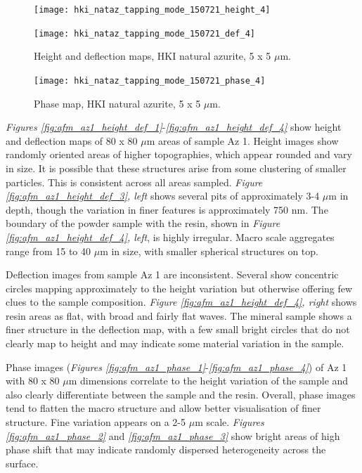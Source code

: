 \begin{figure}[H]
\centering
\begin{minipage}{.45\textwidth}
  \centering
  \texttt{[image: hki\_nataz\_tapping\_mode\_150721\_height\_4]}
\end{minipage}
\begin{minipage}{.45\textwidth}
  \centering
  \texttt{[image: hki\_nataz\_tapping\_mode\_150721\_def\_4]}
\end{minipage}
\caption[Height and deflection maps, HKI natural azurite]{Height and deflection maps, HKI natural azurite, 5 x 5 $\mu$m.}
\label{fig:afm_hki_nataz_height_def_5}
\end{figure}

\begin{figure}[H]
\centering
  \texttt{[image: hki\_nataz\_tapping\_mode\_150721\_phase\_4]}
\caption[Phase map, HKI natural azurite]{Phase map, HKI natural azurite, 5 x 5 $\mu$m.}
\label{fig:afm_hki_nataz_phase_5}
\end{figure}



\textit{Figures \ref{fig:afm_az1_height_def_1}}-\textit{\ref{fig:afm_az1_height_def_4}} show height and deflection maps of 80 x 80 $\mu$m areas of sample Az 1. Height images show randomly oriented areas of higher topographies, which appear rounded and vary in size. It is possible that these structures arise from some clustering of smaller particles. This is consistent across all areas sampled. \textit{Figure \ref{fig:afm_az1_height_def_3}, left} shows several pits of approximately 3-4 $\mu$m in depth, though the variation in finer features is approximately 750 nm. The boundary of the powder sample with the resin, shown in \textit{Figure \ref{fig:afm_az1_height_def_4}, left}, is highly irregular. Macro scale aggregates range from 15 to 40 $\mu$m in size, with smaller spherical structures on top.

Deflection images from sample Az 1 are inconsistent. Several show concentric circles mapping approximately to the height variation but otherwise offering few clues to the sample composition. \textit{Figure \ref{fig:afm_az1_height_def_4}, right} shows resin areas as flat, with broad and fairly flat waves. The mineral sample shows a finer structure in the deflection map, with a few small bright circles that do not clearly map to height and may indicate some material variation in the sample.

Phase images (\textit{Figures \ref{fig:afm_az1_phase_1}}-\textit{\ref{fig:afm_az1_phase_4}}) of Az 1 with 80 x 80 $\mu$m dimensions correlate to the height variation of the sample and also clearly differentiate between the sample and the resin. Overall, phase images tend to flatten the macro structure and allow better visualisation of finer structure. Fine variation appears on a 2-5 $\mu$m scale. \textit{Figures \ref{fig:afm_az1_phase_2}} and \textit{\ref{fig:afm_az1_phase_3}} show bright areas of high phase shift that may indicate randomly dispersed heterogeneity across the surface.  

